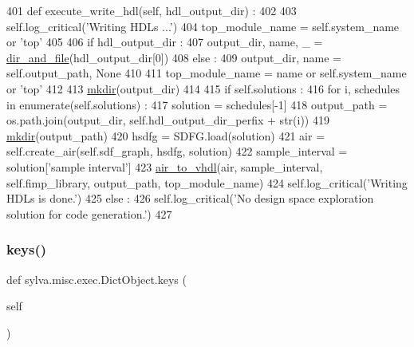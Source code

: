 \begin{DoxyCode}
401   \textcolor{keyword}{def }execute\_write\_hdl(self, hdl\_output\_dir) :
402 
403     self.log\_critical(\textcolor{stringliteral}{'Writing HDLs ...'})
404     top\_module\_name = self.system\_name \textcolor{keywordflow}{or} \textcolor{stringliteral}{'top'}
405 
406     \textcolor{keywordflow}{if} hdl\_output\_dir :
407       output\_dir, name, \_ = \hyperlink{namespacesylva_1_1misc_1_1util_a0ce6d1d719234031353b60ac60f2af0d}{dir\_and\_file}(hdl\_output\_dir[0])
408     \textcolor{keywordflow}{else} :
409       output\_dir, name = self.output\_path, \textcolor{keywordtype}{None}
410 
411     top\_module\_name = name \textcolor{keywordflow}{or} self.system\_name \textcolor{keywordflow}{or} \textcolor{stringliteral}{'top'}
412 
413     \hyperlink{namespacesylva_1_1misc_1_1util_af426e429c40209bbb46e3a0e8f139a44}{mkdir}(output\_dir)
414 
415     \textcolor{keywordflow}{if} self.solutions :
416       \textcolor{keywordflow}{for} i, schedules \textcolor{keywordflow}{in} enumerate(self.solutions) :
417         solution = schedules[-1]
418         output\_path = os.path.join(output\_dir, self.hdl\_output\_dir\_perfix + str(i))
419         \hyperlink{namespacesylva_1_1misc_1_1util_af426e429c40209bbb46e3a0e8f139a44}{mkdir}(output\_path)
420         hsdfg = SDFG.load(solution)
421         air = self.create\_air(self.sdf\_graph, hsdfg, solution)
422         sample\_interval = solution[\textcolor{stringliteral}{'sample interval'}]
423         \hyperlink{namespacesylva_1_1code__generation_1_1air_a12c49366c61395ad719575c8715849cc}{air\_to\_vhdl}(air, sample\_interval, self.fimp\_library, output\_path, top\_module\_name)
424       self.log\_critical(\textcolor{stringliteral}{'Writing HDLs is done.'})
425     \textcolor{keywordflow}{else} :
426       self.log\_critical(\textcolor{stringliteral}{'No design space exploration solution for code generation.'})
427 
\end{DoxyCode}
\mbox{\label{classsylva_1_1misc_1_1exec_1_1_dict_object_a8a81846b980700e7552d76f4fa1eff1e}} 
\subsubsection{\texorpdfstring{keys()}{keys()}}
{\footnotesize\ttfamily def sylva.\+misc.\+exec.\+Dict\+Object.\+keys (\begin{DoxyParamCaption}\item[{}]{self }\end{DoxyParamCaption})\hspace{0.3cm}{\ttfamily [inherited]}}



